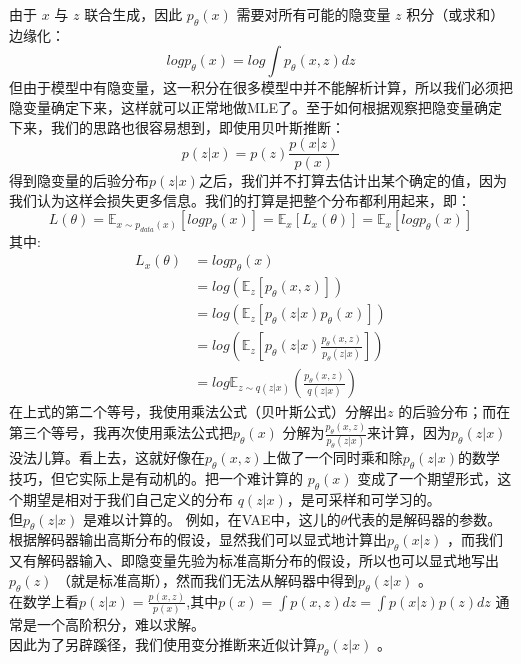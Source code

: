 \documentclass[final]{ws-ijseke}
\begin{document}
由于 $x$ 与 $z$ 联合生成，因此 $p_\theta(x)$ 需要对所有可能的隐变量 $z$ 积分（或求和）边缘化：
\begin{equation*}
logp_\theta(x) = log\int p_\theta(x,z)dz
\end{equation*}
\hspace*{2em} 但由于模型中有隐变量，这一积分在很多模型中并不能解析计算，所以我们必须把隐变量确定下来，这样就可以正常地做MLE了。至于如何根据观察把隐变量确定下来，我们的思路也很容易想到，即使用贝叶斯推断：
\begin{equation*}
p(z|x) = p(z) \frac{p(x|z)}{p(x)}
\end{equation*}
\hspace*{2em} 得到隐变量的后验分布$p(z|x)$之后，我们并不打算去估计出某个确定的值，因为我们认为这样会损失更多信息。我们的打算是把整个分布都利用起来，即：
\begin{equation*}
L(\theta)= \mathbb{E}_{x\sim p_{data}(x)}[logp_\theta(x)] = \mathbb{E}_x[L_x(\theta)] = \mathbb{E}_x[logp_\theta(x)]
\end{equation*}
其中:
\begin{align*}
L_x(\theta) &= logp_\theta(x) \\ &= log(\mathbb{E}_z[p_\theta(x,z)]) \\ &=   log(\mathbb{E}_z[p_\theta(z|x)p_\theta(x)]) \\&= log(\mathbb{E}_z[p_\theta(z|x)\frac{p_\theta(x, z)}{p_\theta(z|x)}])
\\ &= log\mathbb{E}_{z\sim q(z|x)}(\frac{p_\theta(x,z)}{q(z|x)})
\end{align*}
\hspace*{2em} 在上式的第二个等号，我使用乘法公式（贝叶斯公式）分解出$z$ 的后验分布；而在第三个等号，我再次使用乘法公式把$p_\theta(x)$ 分解为$\frac{p_\theta(x,z)}{p_\theta(z|x)}$来计算，因为$p_\theta(z|x)$没法儿算。看上去，这就好像在$p_\theta(x, z)$上做了一个同时乘和除$p_\theta(z|x)$的数学技巧，但它实际上是有动机的。把一个难计算的 $p_\theta(x)$ 变成了一个期望形式，这个期望是相对于我们自己定义的分布 $q(z|x)$，是可采样和可学习的。\\
\hspace*{2em} 但$p_\theta(z|x)$ 是难以计算的。
例如，在VAE中，这儿的$\theta$代表的是解码器的参数。根据解码器输出高斯分布的假设，显然我们可以显式地计算出$p_\theta(x|z)$ ，而我们又有解码器输入、即隐变量先验为标准高斯分布的假设，所以也可以显式地写出$p_\theta(z)$ （就是标准高斯），然而我们无法从解码器中得到$p_\theta(z|x)$  。\\\hspace*{2em} 在数学上看$p(z|x) = \frac{p(x,z)}{p(x)}$,其中$p(x) = \int p(x,z)dz = \int p(x|z)p(z)dz$ 通常是一个高阶积分，难以求解。
\\ \hspace*{2em} 因此为了另辟蹊径，我们使用变分推断来近似计算$p_\theta(z|x)$ 。
\end{document}
